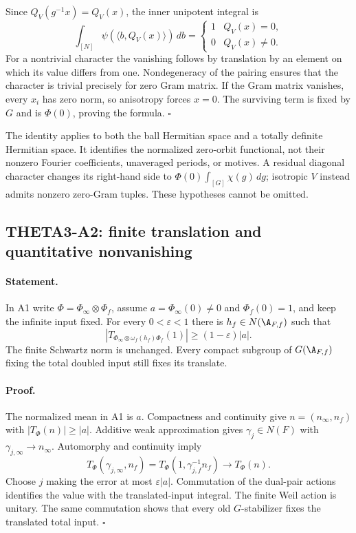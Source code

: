 \documentclass[11pt]{article}
\theoremstyle{definition}\newtheorem{definition}[theorem]{Definition}\newtheorem{remark}[theorem]{Remark}
\begin{document}
Since $Q_V(g^{-1}x)=Q_V(x)$, the inner unipotent integral is
\[
 \int_{[N]}\psi(\langle b,Q_V(x)\rangle)\,db
 =\begin{cases}1&Q_V(x)=0,\\0&Q_V(x)\ne0.\end{cases}
\]
For a nontrivial character the vanishing follows by translation by an
element on which its value differs from one. Nondegeneracy of the
pairing ensures that the character is trivial precisely for zero Gram
matrix. If the Gram matrix vanishes, every $x_i$ has zero norm, so
anisotropy forces $x=0$. The surviving term is fixed by $G$ and is
$\Phi(0)$, proving the formula. $\square$

The identity applies to both the ball Hermitian space and a totally
definite Hermitian space. It identifies the normalized zero-orbit
functional, not their nonzero Fourier coefficients, unaveraged periods,
or motives. A residual diagonal character changes its right-hand side
to $\Phi(0)\int_{[G]}\chi(g)\,dg$; isotropic $V$ instead admits
nonzero zero-Gram tuples. These hypotheses cannot be omitted.

\subsection{THETA3-A2: finite translation and quantitative nonvanishing}\label{A2}

\paragraph{Statement.}
In A1 write $\Phi=\Phi_\infty\otimes\Phi_f$, assume
$a=\Phi_\infty(0)\ne0$ and $\Phi_f(0)=1$, and keep the infinite input
fixed. For every $0<\varepsilon<1$ there is $h_f\in N(\A_{F,f})$
such that
\[
 \left|T_{\Phi_\infty\otimes\omega_f(h_f)\Phi_f}(1)\right|
                   \geq(1-\varepsilon)|a|.
\]
The finite Schwartz norm is unchanged. Every compact subgroup of
$G(\A_{F,f})$ fixing the total doubled input still fixes its translate.

\paragraph{Proof.}
The normalized mean in A1 is $a$. Compactness and continuity give
$n=(n_\infty,n_f)$ with $|T_\Phi(n)|\geq|a|$. Additive weak
approximation gives $\gamma_j\in N(F)$ with
$\gamma_{j,\infty}\longrightarrow n_\infty$. Automorphy and
continuity imply
\[
 T_\Phi(\gamma_{j,\infty},n_f)
 =T_\Phi(1,\gamma_{j,f}^{-1}n_f)
 \longrightarrow T_\Phi(n).
\]
Choose $j$ making the error at most $\varepsilon|a|$. Commutation of
the dual-pair actions identifies the value with the translated-input
integral. The finite Weil action is unitary. The same commutation shows
that every old $G$-stabilizer fixes the translated total input.
$\square$
\end{document}

